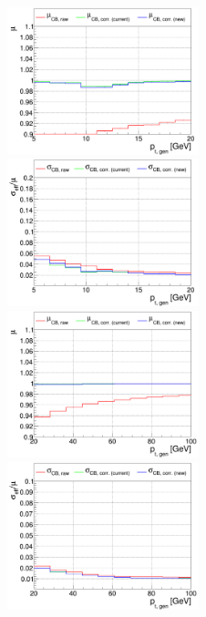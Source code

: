 
\begin{figure}

\includegraphics[width=0.495\textwidth]{./plots_pdf/ECAL_plots/plotsNOPU/EB/FULL/pdf/GENPT/EBFULL_GENPT_0005_0020_MuOverBins.pdf}
\includegraphics[width=0.495\textwidth]{./plots_pdf/ECAL_plots/plotsNOPU/EB/FULL/pdf/GENPT/EBFULL_GENPT_0005_0020_EffSigmaOverBins.pdf}
\includegraphics[width=0.495\textwidth]{./plots_pdf/ECAL_plots/plotsNOPU/EB/FULL/pdf/GENPT/EBFULL_GENPT_0020_0100_MuOverBins.pdf}
\includegraphics[width=0.495\textwidth]{./plots_pdf/ECAL_plots/plotsNOPU/EB/FULL/pdf/GENPT/EBFULL_GENPT_0020_0100_EffSigmaOverBins.pdf}

\end{figure}
